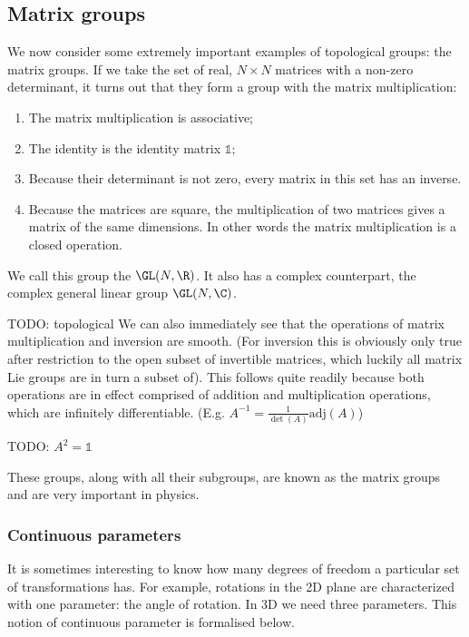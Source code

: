 \subsection{Matrix groups}
We now consider some extremely important examples of topological groups: the matrix groups.
If we take the set of real, $N\times N$ matrices with a non-zero determinant, it turns out that they form a group with the matrix multiplication:
\begin{enumerate}
\item The matrix multiplication is associative;
\item The identity is the identity matrix $\mathbb{1}$;
\item Because their determinant is not zero, every matrix in this set has an inverse.
\item Because the matrices are square, the multiplication of two matrices gives a matrix of the same dimensions. In other words the matrix multiplication is a closed operation.
\end{enumerate}
We call this group the  $\GL(N, \R)$. It also has a complex counterpart, the complex general linear group $\GL(N, \C)$.

TODO: topological
We can also immediately see that the operations of matrix multiplication and inversion are smooth. (For inversion this is obviously only true after restriction to the open subset of invertible matrices, which luckily all matrix Lie groups are in turn a subset of). This follows quite readily because both operations are in effect comprised of addition and multiplication operations, which are infinitely differentiable. (E.g. $A^{-1} = \frac{1}{\det(A)}\mathrm{adj}(A)$)

\begin{example}
TODO: $A^2 = \mathbb{1}$
\end{example}

These groups, along with all their subgroups, are known as the matrix groups and are very important in physics.

\subsubsection{Continuous parameters}
It is sometimes interesting to know how many degrees of freedom a particular set of transformations has. For example, rotations in the 2D plane are characterized with one parameter: the angle of rotation. In 3D we need three parameters. This notion of continuous parameter is formalised below.

